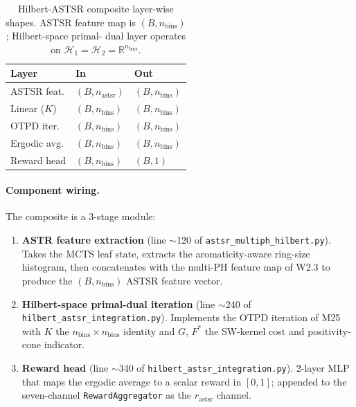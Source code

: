 \begin{table}[h]
  \centering
  \small
  \caption{Hilbert-ASTSR composite layer-wise shapes.  ASTSR
  feature map is $(B, n_{\mathrm{bins}})$; Hilbert-space primal-
  dual layer operates on
  $\mathcal{H}_{1} = \mathcal{H}_{2} = \mathbb{R}^{n_{\mathrm{bins}}}$.}
  \label{tab:hilbert-astsr-shapes}
  \begin{tabular}{lll}
    \toprule
    \textbf{Layer} & \textbf{In} & \textbf{Out} \\
    \midrule
    ASTSR feat.   & $(B, n_{\mathrm{astsr}})$ & $(B, n_{\mathrm{bins}})$ \\
    Linear ($K$)  & $(B, n_{\mathrm{bins}})$ & $(B, n_{\mathrm{bins}})$ \\
    OTPD iter.    & $(B, n_{\mathrm{bins}})$ & $(B, n_{\mathrm{bins}})$ \\
    Ergodic avg.  & $(B, n_{\mathrm{bins}})$ & $(B, n_{\mathrm{bins}})$ \\
    Reward head   & $(B, n_{\mathrm{bins}})$ & $(B, 1)$ \\
    \bottomrule
  \end{tabular}
\end{table}

\paragraph{Component wiring.}
The composite is a 3-stage module:
\begin{enumerate}
  \item \textbf{ASTR feature extraction} (line $\sim$120 of
        \texttt{astsr\_multiph\_hilbert.py}).  Takes the MCTS leaf
        state, extracts the aromaticity-aware ring-size histogram,
        then concatenates with the multi-PH feature map of W2.3 to
        produce the $(B, n_{\mathrm{bins}})$ ASTSR feature vector.
  \item \textbf{Hilbert-space primal-dual iteration} (line
        $\sim$240 of \texttt{hilbert\_astsr\_integration.py}).
        Implements the OTPD iteration of M25 with $K$ the
        $n_{\mathrm{bins}} \times n_{\mathrm{bins}}$ identity and
        $G$, $F^{\ast}$ the SW-kernel cost and positivity-cone
        indicator.
  \item \textbf{Reward head} (line $\sim$340 of
        \texttt{hilbert\_astsr\_integration.py}).  2-layer MLP
        that maps the ergodic average to a scalar reward in
        $[0, 1]$; appended to the seven-channel
        \texttt{RewardAggregator} as the $r_{\mathrm{astsr}}$
        channel.
\end{enumerate}

